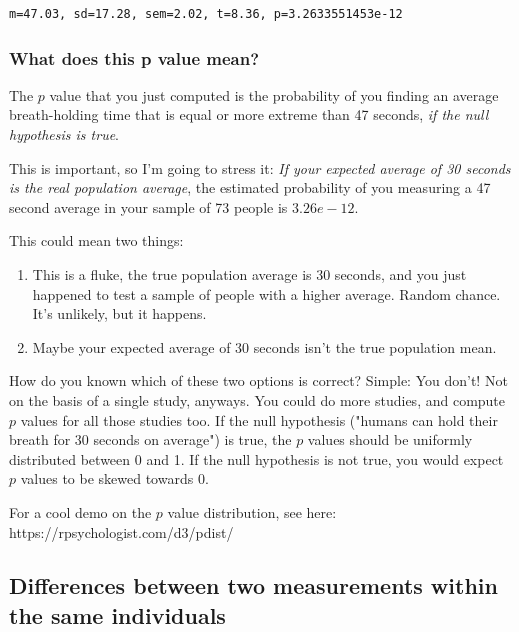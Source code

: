 \documentclass[11pt]{article}
\begin{document}
    \begin{Verbatim}[commandchars=\\\{\}]
m=47.03, sd=17.28, sem=2.02, t=8.36, p=3.2633551453e-12

    \end{Verbatim}

    \subsubsection{What does this p value
mean?}\label{what-does-this-p-value-mean}

The \(p\) value that you just computed is the probability of you finding
an average breath-holding time that is equal or more extreme than 47
seconds, \emph{if the null hypothesis is true}.

This is important, so I'm going to stress it: \emph{If your expected
average of 30 seconds is the real population average}, the estimated
probability of you measuring a 47 second average in your sample of 73
people is \(3.26e-12\).

This could mean two things:

\begin{enumerate}
\def\labelenumi{\arabic{enumi})}
\item
  This is a fluke, the true population average is 30 seconds, and you
  just happened to test a sample of people with a higher average. Random
  chance. It's unlikely, but it happens.
\item
  Maybe your expected average of 30 seconds isn't the true population
  mean.
\end{enumerate}

How do you known which of these two options is correct? Simple: You
don't! Not on the basis of a single study, anyways. You could do more
studies, and compute \(p\) values for all those studies too. If the null
hypothesis ("humans can hold their breath for 30 seconds on average") is
true, the \(p\) values should be uniformly distributed between 0 and 1.
If the null hypothesis is not true, you would expect \(p\) values to be
skewed towards 0.

For a cool demo on the \(p\) value distribution, see here:
https://rpsychologist.com/d3/pdist/

    \subsection{Differences between two measurements within the same
individuals}\label{differences-between-two-measurements-within-the-same-individuals}
\end{document}
